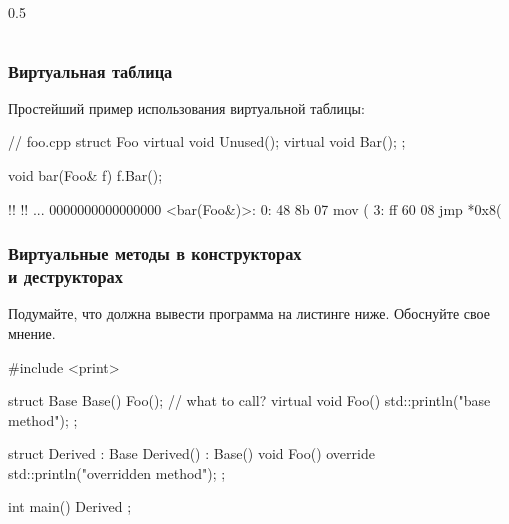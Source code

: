 \documentclass[compress, 8pt, aspectratio=169]{beamer}
\begin{document}
\begin{frame}[fragile]
\begin{columns}
\begin{column}{0.5\textwidth}
        \end{column}

    \end{columns}

\end{frame}

\begin{frame}[fragile]

    \frametitle{Виртуальная таблица}

    Простейший пример использования виртуальной таблицы:

    \begin{myinplacelisting}[minted language=cpp]
// foo.cpp
struct Foo {
    virtual void Unused();
    virtual void Bar();
};

void bar(Foo& f) {
    f.Bar();
}
    \end{myinplacelisting}

    \begin{terminalwindow}
!!
!!
...
0000000000000000 <bar(Foo&)>:
   0:   48 8b 07                mov    (%
   3:   ff 60 08                jmp    *0x8(%
    \end{terminalwindow}

\end{frame}

\begin{frame}[fragile]

    \frametitle{Виртуальные методы в конструкторах \\ и деструкторах}

    \begin{task}
        Подумайте, что должна вывести программа на листинге ниже.
        Обоснуйте свое мнение.
    \end{task}

    \begin{myinplacelisting}[minted language=cpp]
#include <print>

struct Base {
    Base() {
        Foo(); // what to call?
    }
    virtual void Foo() { std::println("base method"); }
};

struct Derived : Base {
    Derived() : Base() {}
    void Foo() override { std::println("overridden method"); }
};

int main() {
    Derived {};
}
    \end{myinplacelisting}

\end{frame}
\end{document}
